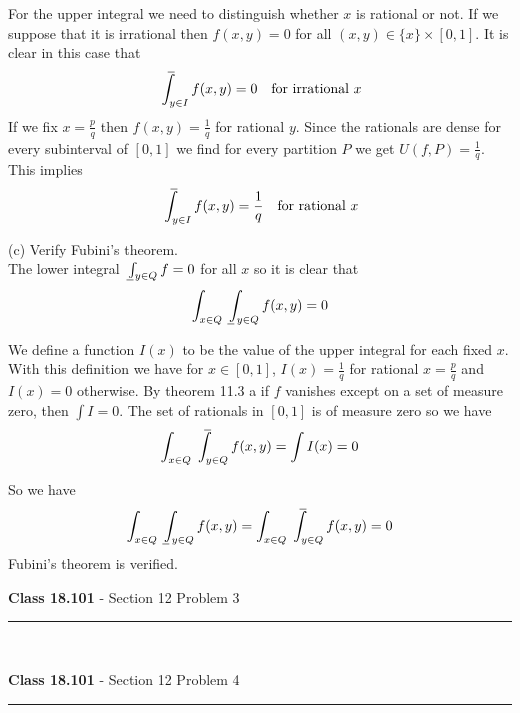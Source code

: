 \documentclass[11pt,reqno]{article}
\def\uint{\mathchoice%
    {\mkern13mu\overline{\vphantom{\intop}\mkern9mu}\mkern-20mu}%
    {\mkern9mu\overline{\vphantom{\intop}\mkern9mu}\mkern-14mu}%
    {\mkern9mu\overline{\vphantom{\intop}\mkern9mu}\mkern-14mu}%
    {\mkern9mu\overline{\vphantom{\intop}\mkern9mu}\mkern-14mu}%
  \int}
\def\lint{\mkern3mu\underline{\vphantom{\intop}\mkern9mu}\mkern-10mu\int}
\begin{document}
For the upper integral we need to distinguish whether $x$ is rational or not. If we suppose that it is irrational then $f(x,y) = 0$ for all $(x,y) \in \{x\} \times [0,1]$. It is clear in this case that 
\[  \uint_{y \in I} f(x,y)  = 0 \quad \text{for irrational $x$} \]
If we fix $x = \frac{p}{q}$ then $f(x,y) = \frac{1}{q}$ for rational $y$. Since the rationals are dense for every subinterval of $[0,1]$ we find for every partition $P$ we get $U(f,P) = \frac{1}{q}$. This implies
\[  \uint_{y \in I} f(x,y)  = \frac{1}{q} \quad \text{for rational $x$} \]

\noindent (c) Verify Fubini's theorem.\\

\noindent The lower integral $\lint_{y \in Q} f = 0$ for all $x$ so it is clear that 
\[ \int_{x \in Q} \lint_{y \in Q} f(x,y) = 0 \]

We define a function $I(x)$ to be the value of the upper integral for each fixed $x$. With this definition we have for $x \in [0,1]$, $I(x) = \frac{1}{q}$ for rational $x = \frac{p}{q}$ and $I(x) = 0$ otherwise. By theorem 11.3 a if $f$ vanishes except on a set of measure zero, then $\int I = 0$. The set of rationals in $[0,1]$ is of measure zero so we have 
\[ \int_{x \in Q} \uint_{y \in Q} f(x,y) =  \int I(x) = 0 \]

\noindent So we have 
\[  \int_{x \in Q} \lint_{y \in Q} f(x,y) = \int_{x \in Q} \uint_{y \in Q} f(x,y) = 0 \]
Fubini's theorem is verified.\\

\begin{flushleft} 
\textbf{Class 18.101} - Section 12 Problem 3\\
\rule{500pt}{1pt}\\
\end{flushleft} 



\begin{flushleft} 
\textbf{Class 18.101} - Section 12 Problem 4\\
\rule{500pt}{1pt}\\
\end{flushleft} 
\end{document}
